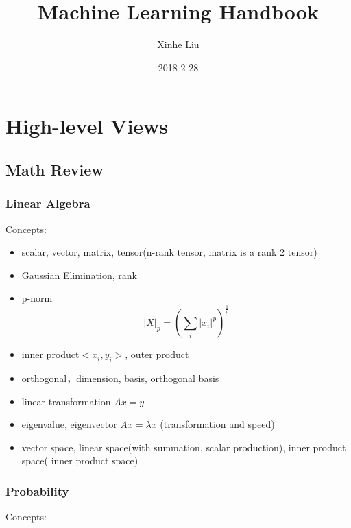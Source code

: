 \documentclass[11pt, openany]{book}              %
\title{\bf Machine Learning Handbook}    %
\author{Xinhe Liu}              %
\date{2018-2-28}                           %
\begin{document}
\maketitle                              %
\tableofcontents                        %
\mainmatter                             %

\part{High-level Views}
\chapter{Math Review}

\section{Linear Algebra}

Concepts:

\begin{itemize}
    \item scalar, vector, matrix, tensor(n-rank tensor, matrix is a rank 2 tensor) 
    \item Gaussian Elimination, rank
    \item p-norm $$|X|_p = (\sum_i |x_i|^p)^{\frac{1}{p}}$$
    \item inner product$<x_i,y_i>$, outer product
    \item orthogonal，dimension, basis, orthogonal basis
    \item linear transformation $Ax = y$
    \item eigenvalue, eigenvector $Ax =\lambda x$ (transformation and speed)
    \item vector space, linear space(with summation, scalar production), inner product space( inner product space) 
\end{itemize}


\section{Probability}

Concepts:
\end{document}
